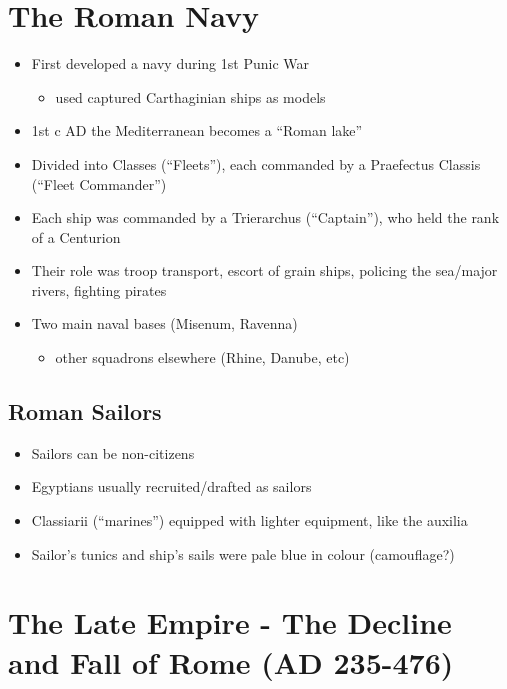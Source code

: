 \documentclass[12pt, twoside]{article}
\begin{document}
\section{The Roman Navy}
\begin{itemize}
\item First developed a navy during 1st Punic War
	\begin{itemize}
	\item used captured Carthaginian ships as models
	\end{itemize}
\item 1st c AD the Mediterranean becomes a “Roman lake”
\item Divided into Classes (“Fleets”), each commanded by a Praefectus Classis (“Fleet Commander”)
\item Each ship was commanded by a Trierarchus (“Captain”), who held the rank of a Centurion
\item Their role was troop transport, escort of grain ships, policing the sea/major rivers, fighting pirates
\item Two main naval bases (Misenum, Ravenna)
	\begin{itemize}
	\item  other squadrons elsewhere (Rhine, Danube, etc)
	\end{itemize}
\end{itemize}

\subsection{Roman Sailors}
\begin{itemize}
\item Sailors can be non-citizens
\item Egyptians usually recruited/drafted as sailors
\item Classiarii (“marines”) equipped with lighter equipment, like the auxilia
\item Sailor’s tunics and ship’s sails were pale blue in colour (camouflage?)
\end{itemize}

\section{The Late Empire - The Decline and Fall of Rome (AD 235-476)}
\end{document}
